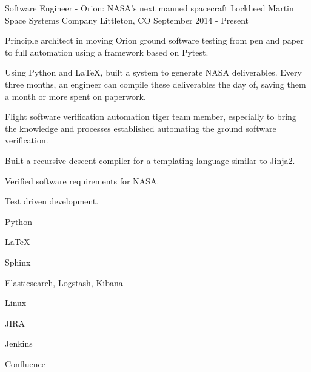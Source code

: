 

\begin{cventries}

  \cventry
    {Software Engineer - Orion: NASA's next manned spacecraft} %
    {Lockheed Martin Space Systems Company} %
    {Littleton, CO} %
    {September 2014 - Present} %
    {
      \begin{cvitems} %
        \item {Principle architect in moving Orion ground software testing from pen and paper to full automation using a framework based on Pytest.}
        \item {Using Python and LaTeX, built a system to generate NASA deliverables.  Every three months, an engineer can compile these deliverables the day of, saving them a month or more spent on paperwork.}
        \item {Flight software verification automation tiger team member, especially to bring the knowledge and processes established automating the ground software verification.}
        \item {Built a recursive-descent compiler for a templating language similar to Jinja2.}
        \item {Verified software requirements for NASA.}
        \item {Test driven development.}
      \end{cvitems}
    }
    \begin{cventryskills}
      \item Python
      \item LaTeX
      \item Sphinx
      \item Elasticsearch, Logstash, Kibana
      \item Linux
      \item JIRA
      \item Jenkins
      \item Confluence
    \end{cventryskills}


\end{cventries}
